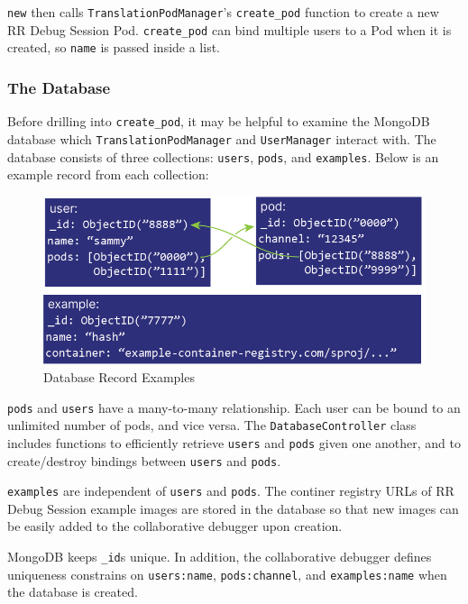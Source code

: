\documentclass[12pt]{article}
\begin{document}
\lstinline{new} then calls \lstinline{TranslationPodManager}'s
\lstinline{create_pod} function to create a new RR Debug Session Pod.
\lstinline{create_pod} can bind multiple users to a Pod when it is
created, so \lstinline{name} is passed inside a list.

\subsubsection{The Database} Before drilling into \lstinline{create_pod},
it may be helpful to examine the MongoDB database which
\lstinline{TranslationPodManager} and \lstinline{UserManager} interact
with.  The database consists of three collections: \lstinline{users},
\lstinline{pods}, and \lstinline{examples}.  Below is an example
record from each collection:

\begin{figure}[h!]

  \includegraphics[scale=1]{database_example}
  \centering
  \caption{Database Record Examples}
  \label{rr:detailed}
\end{figure}

\lstinline{pods} and \lstinline{users} have a many-to-many
relationship.  Each user can be bound to an unlimited number of pods,
and vice versa.  The \lstinline{DatabaseController} class includes
functions to efficiently retrieve \lstinline{users} and
\lstinline{pods} given one another, and to create/destroy bindings
between \lstinline{users} and \lstinline{pods}.
\par

\lstinline{examples} are independent of \lstinline{users} and
\lstinline{pods}.  The continer registry URLs of RR Debug Session
example images are stored in the database so that new images can be
easily added to the collaborative debugger upon creation.
\par

MongoDB keeps \lstinline{_id}s unique.  In addition, the collaborative
debugger defines uniqueness constrains on \lstinline{users:name},
\lstinline{pods:channel}, and \lstinline{examples:name} when the
database is created.
\end{document}
